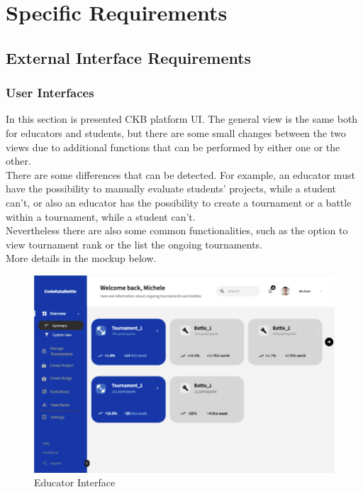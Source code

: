 \section{Specific Requirements}

\vspace{12pt}

\subsection{External Interface Requirements}

\vspace{12pt}

\subsubsection{User Interfaces}

In this section is presented CKB platform UI. The general view is the same both for educators and students, but there are some small changes between the two views due to additional functions that can be performed by either one or the other. \\ There are some differences that can be detected. For example, an educator must have the possibility to manually evaluate students' projects, while a student can't, or also an educator has the possibility to create a tournament or a battle within a tournament, while a student can't.
\\Nevertheless there are also some common functionalities, such as the option to view tournament rank or the list the ongoing tournaments. 
\\More details in the mockup below.

\vspace{100pt}

\begin{figure}[h]
    \centering
    \includegraphics[scale=0.5]{src/educator_view.png}
    \caption*{Educator Interface}
\end{figure} \vspace{0.5cm}

